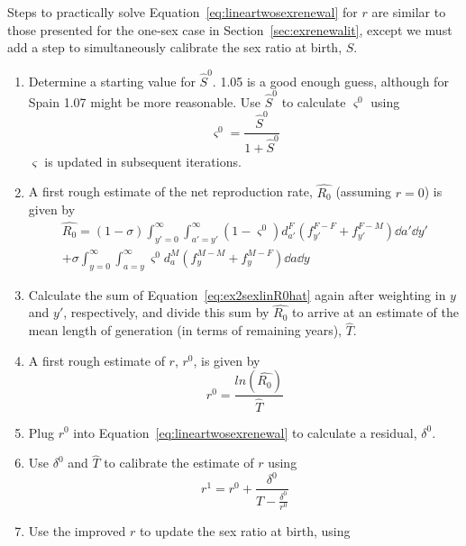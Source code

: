  \FloatBarrier
\label{sec:exrenewalit2}
Steps to practically solve Equation~\eqref{eq:lineartwosexrenewal} for $r$ are
similar to those presented for the one-sex case in
Section~\ref{sec:exrenewalit}, except we must add a step to simultaneously
calibrate the sex ratio at birth, $S$.
\begin{enumerate}
 \item Determine a starting value for $\hat{S}^0$. 1.05 is a good enough guess,
 although for Spain 1.07 might be more reasonable. Use $\hat{S}^0$ to 
 calculate $\varsigma^0$ using
\begin{equation}
\label{eq:getvarsigmal}
\varsigma^0 = \frac{\hat{S}^0}{1+\hat{S}^0}
\end{equation}
$\varsigma$ is updated in subsequent iterations.
   \item A first rough estimate of the net reproduction rate, $\widehat{R_0}$ (assuming
  $r=0$) is given by 
 \begin{equation}
 \label{eq:ex2sexlinR0hat}
 \begin{split}
 \widehat{R_0} = (1 - \sigma)  \int _{y'=0}^\infty \int_{a'=y'}^\infty 
                (1-\varsigma^0)d_{a'}^F \left(f_{y'}^{F-F} + f_{y'}^{F-M}\right)
                \dd a'\dd y' \\ + \sigma  \int _{y=0}^\infty \int _{a=y}^\infty 
               \varsigma^0 d_{a}^M  \left(f_{y}^{M-M}+ f_{y}^{M-F}\right) \dd a
               \dd y
 \end{split}
 \end{equation}
 \item Calculate the sum of Equation~\eqref{eq:ex2sexlinR0hat} again
 after weighting in $y$ and $y'$, respectively, and divide this sum by
 $\widehat{R_0}$ to arrive at an estimate of the mean length of generation (in
 terms of remaining years), $\widehat{T}$.
  \item A first rough estimate of $r$, $r^0$, is given by
   \begin{equation}
   r^0 = \frac{ln(\widehat{R_0})}{\widehat{T}}
   \end{equation}
  \item Plug $r^0$ into Equation~\eqref{eq:lineartwosexrenewal} to calculate a
  residual, $\delta^0$.
  \item Use $\delta^0$ and $\widehat{T}$ to calibrate the estimate of $r$
  using
  \begin{equation}
  r^{1} = r^0 + \frac{\delta^0}{\widehat{T} - \frac{\delta^0}{r^0}}
  \end{equation}
  \item  Use the improved $r$ to update the sex ratio at birth, using

\end{enumerate}
